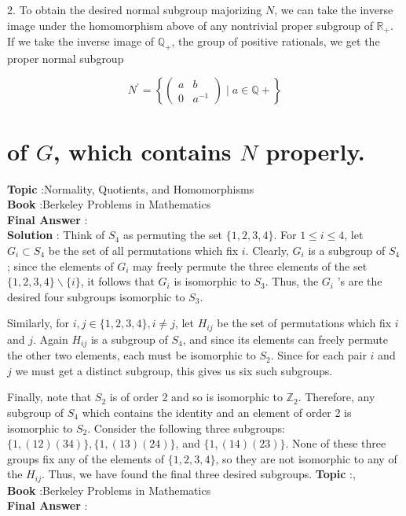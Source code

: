 \documentclass[10pt]{article}
\begin{document}
2. To obtain the desired normal subgroup majorizing $N$, we can take the inverse image under the homomorphism above of any nontrivial proper subgroup of $\mathbb{R}_{+}$. If we take the inverse image of $\mathbb{Q}_{+}$, the group of positive rationals, we get the proper normal subgroup

$$
N^{\prime}=\left\{\left(\begin{array}{cc}
a & b \\
0 & a^{-1}
\end{array}\right) \mid a \in \mathbb{Q}+\right\}
$$



\section{of $G$, which contains $N$ properly.}
\textbf{Topic} :Normality, Quotients, and Homomorphisms \\
\textbf{Book} :Berkeley Problems in Mathematics\\
\textbf{Final Answer} :\\


\textbf{Solution} : Think of $S_{4}$ as permuting the set $\{1,2,3,4\}$. For $1 \leqslant i \leqslant 4$, let $G_{i} \subset S_{4}$ be the set of all permutations which fix $i$. Clearly, $G_{i}$ is a subgroup of $S_{4}$; since the elements of $G_{i}$ may freely permute the three elements of the set $\{1,2,3,4\} \backslash\{i\}$, it follows that $G_{i}$ is isomorphic to $S_{3}$. Thus, the $G_{i}$ 's are the desired four subgroups isomorphic to $S_{3}$.

Similarly, for $i, j \in\{1,2,3,4\}, i \neq j$, let $H_{i j}$ be the set of permutations which fix $i$ and $j$. Again $H_{i j}$ is a subgroup of $S_{4}$, and since its elements can freely permute the other two elements, each must be isomorphic to $S_{2}$. Since for each pair $i$ and $j$ we must get a distinct subgroup, this gives us six such subgroups.

Finally, note that $S_{2}$ is of order 2 and so is isomorphic to $\mathbb{Z}_{2}$. Therefore, any subgroup of $S_{4}$ which contains the identity and an element of order 2 is isomorphic to $S_{2}$. Consider the following three subgroups: $\{1,(12)(34)\},\{1,(13)(24)\}$, and $\{1,(14)(23)\}$. None of these three groups fix any of the elements of $\{1,2,3,4\}$, so they are not isomorphic to any of the $H_{i j}$. Thus, we have found the final three desired subgroups.
\textbf{Topic} :, \\
\textbf{Book} :Berkeley Problems in Mathematics\\
\textbf{Final Answer} :\\
\end{document}
